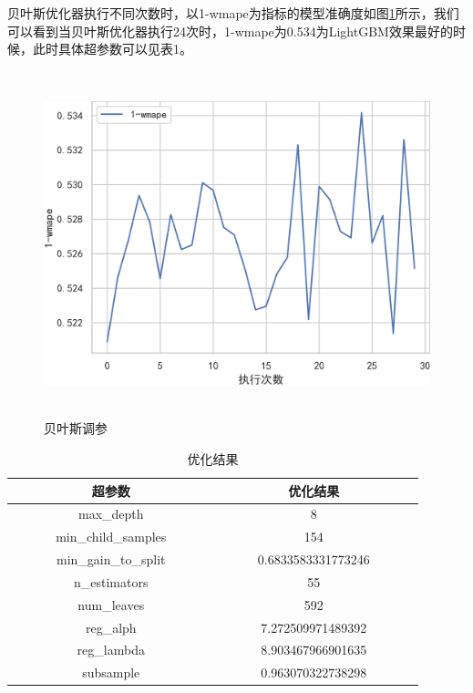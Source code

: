 \documentclass[withoutpreface,bwprint]{cumcmthesis}
\begin{document}
    贝叶斯优化器执行不同次数时，以1-wmape为指标的模型准确度如图\ref{贝叶斯调参}所示，我们可以看到当贝叶斯优化器执行24次时，1-wmape为0.534为LightGBM效果最好的时候，此时具体超参数可以见表1。

  

    \begin{figure}[htbp]
     \centering
     \includegraphics[width=15cm,height=10cm]{figure/贝叶斯调参.png}%
     \caption{贝叶斯调参}
     \label{贝叶斯调参}
    \end{figure}

\begin{table}[htbp]
  \centering
  \label{优化结果}
  \caption{优化结果}
  \begin{tabular}{ccccc}
   \toprule
    ~~~~ & 超参数 & ~~~~~~~~~ & 优化结果 & ~~~~ \\
   \midrule
   ~~~~ & max\_depth & ~~~~~~~~~ & 8 & ~~~~ \\
   ~~~~ & min\_child\_samples & ~~~~~~~~~ &  154 & ~~~~ \\
   ~~~~ & min\_gain\_to\_split & ~~~~~~~~~ & 0.6833583331773246 & ~~~~ \\
   ~~~~ & n\_estimators & ~~~~~~~~~ & 55 & ~~~~ \\
   ~~~~ & num\_leaves & ~~~~~~~~~ & 592 & ~~~~ \\
   ~~~~ & reg\_alph & ~~~~~~~~~ & 7.272509971489392 & ~~~~ \\
   ~~~~ & reg\_lambda & ~~~~~~~~~ & 8.903467966901635 & ~~~~ \\
   ~~~~ & subsample & ~~~~~~~~~ & 0.963070322738298 & ~~~~ \\
   \bottomrule
\end{tabular}
\end{table}
    
\end{document}
